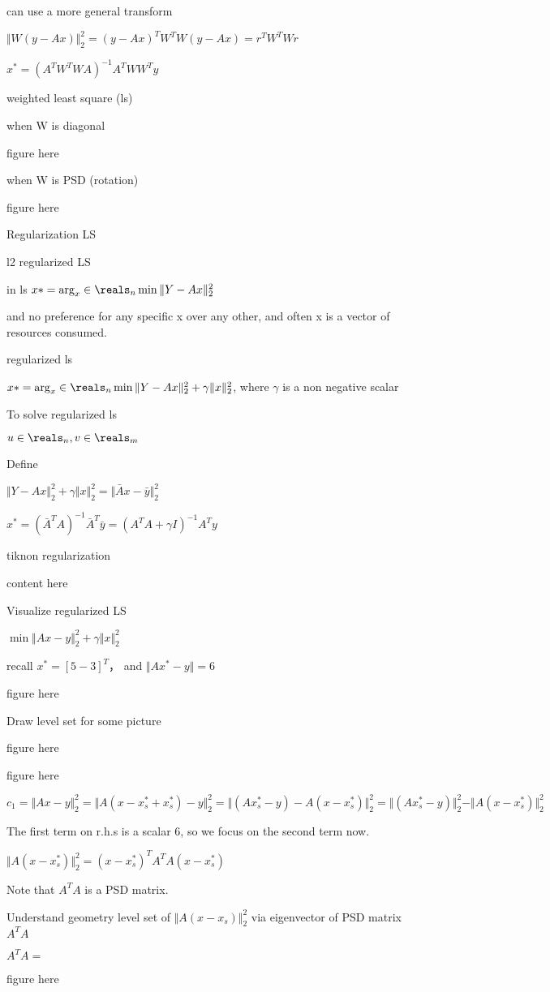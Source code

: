 can use a more general transform 

$\Vert W (y-Ax)\Vert ^2_2 = (y-Ax)^TW^TW(y-Ax)=r^TW^TWr$

$x^*=(A^TW^TWA)^{-1}A^TWW^Ty$




weighted least square (ls) 

when W is diagonal 

figure here

when W is PSD (rotation)

figure here




Regularization LS

l2 regularized LS

in ls $x*=\arg_x\in\reals_{n} \min \Vert Y-Ax\Vert ^2_2$

and no preference for any specific x over any other, and often x is a vector of resources consumed.

regularized ls

$x*=\arg_x\in\reals_{n} \min \Vert Y-Ax\Vert ^2_2 + \gamma \Vert x\Vert ^2_2$, where $\gamma$ is a non negative scalar


To solve regularized ls

$u\in\reals_{n}, v\in\reals_{m}$


Define


$\Vert Y-Ax\Vert ^2_2 + \gamma \Vert x\Vert ^2_2=\Vert \bar{A}x-\bar{y}\Vert^2_2$

$x^*=(\bar{A}^TA)^{-1}\bar{A}^T\bar{y}=(A^TA+\gamma I)^{-1}A^Ty$


tiknon regularization

content here


Visualize regularized LS

$\min \Vert Ax-y\Vert_2^2 +\gamma\Vert x\Vert^2_2$

recall $x^*=[5 -3]^T$， and $\Vert Ax^*-y\Vert = 6$

figure here


Draw level set for some picture

figure here

figure here



$c_1=\Vert Ax-y\Vert^2_2=\Vert A(x-x_s^*+x_s^*)-y\Vert^2_2=\Vert (Ax_s^*-y)-A(x-x_s^*)\Vert^2_2=\Vert (Ax_s^*-y)\Vert^2_2 - \Vert A(x-x_s^*)\Vert^2_2$

The first term on r.h.s is a scalar 6, so we focus on the second term now.

$\Vert A(x-x_s^*)\Vert^2_2= (x-x_s^*)^T A^TA (x-x_s^*)$ 

Note that $A^TA$ is a PSD matrix.


Understand geometry level set of $\Vert A(x-x_s)\Vert^2_2$ via eigenvector of PSD matrix $A^TA$


$A^TA=$

figure here



















